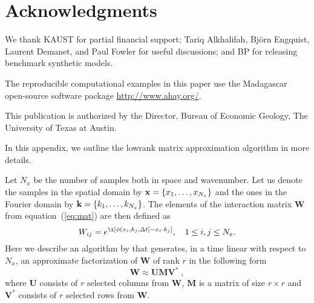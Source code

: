 \section{Acknowledgments}

We thank KAUST for partial financial support; Tariq Alkhalifah,
Bj\"{o}rn Engquist, Laurent Demanet, and Paul Fowler for useful
discussions; and BP for releasing benchmark synthetic models.

The reproducible computational examples in this paper use the
Madagascar open-source software package \url{http://www.ahay.org/}.

This publication is authorized by the Director, Bureau of Economic
Geology, The University of Texas at Austin.

\label{sec:lowrank}

In this appendix, we outline the lowrank matrix approximation
algorithm in more details.

Let $N_x$ be the number of samples both in space and wavenumber. Let
us denote the samples in the spatial domain by
$\mathbf{x}=\{x_1,\ldots,x_{N_x}\}$ and the ones in the Fourier domain by
$\mathbf{k}=\{k_1,\ldots,k_{N_x}\}$. The elements of the interaction matrix
$\mathbf{W}$ from equation~(\ref{eq:mat}) are then defined as
\begin{equation}
W_{ij} = e^{\i [\phi(x_i,k_j,\Delta t] - x_i \cdot k_j]},\quad
1\le i,j\le N_x.
\label{eq:wij}
\end{equation}
Here we describe an algorithm by \cite{engquistying2009} that
generates, in a time linear with respect to $N_x$, an approximate
factorization of $\mathbf{W}$ of rank $r$ in the following form
\begin{equation}
\mathbf{W} \approx \mathbf{U M V^*}\;,
\label{eq:umv}
\end{equation}
where $\mathbf{U}$ consists of $r$ selected columns from $\mathbf{W}$,
$\mathbf{M}$ is a matrix of size $r\times r$ and $\mathbf{V^*}$ consists of $r$
selected rows from $\mathbf{W}$.

